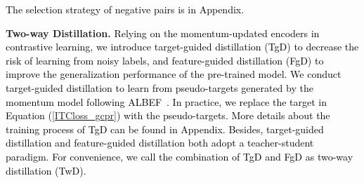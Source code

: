 \documentclass[sigconf]{acmart}
\def\blue{\textcolor{black}}
\def\mmljc{\textcolor{black}}
\def\mmcr{\textcolor{black}}
\begin{document}
\blue{The selection strategy of negative pairs is in Appendix.}




\textbf{Two-way Distillation.}
\mmljc{Relying on the momentum-updated encoders in contrastive learning, we introduce target-guided distillation (TgD) to decrease the risk of learning from noisy labels, and feature-guided distillation (FgD) to improve the generalization performance of the pre-trained model. We conduct target-guided distillation to learn from pseudo-targets generated by the momentum model following ALBEF~\cite{ALBEF}. In practice, we replace the target in Equation (\ref{ITCloss_gcpr}) with the pseudo-targets. \mmcr{More details about the training process of TgD can be found in Appendix.}
Besides, target-guided distillation and feature-guided distillation both adopt a teacher-student paradigm.}
\mmljc{For convenience, we call the combination of TgD and FgD as two-way distillation (TwD). }
\end{document}
